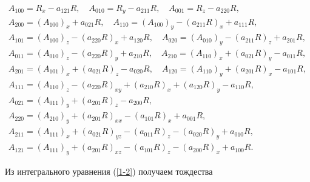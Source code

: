 \begin{gather*}


A_{100}=R_{x}-a_{121}R,\quad A_{010}=R_{y}-a_{211}R,\quad


A_{001}=R_{z}-a_{220}R,\\


A_{200}=(A_{100})_{x}+a_{021}R,\quad


A_{110}=(A_{100})_{y}-(a_{211}R)_{x}+a_{111}R,\\


A_{101}=(A_{100})_{z}-(a_{220}R)_{x}+a_{120}R,\quad


A_{020}=(A_{010})_{y}-(a_{211}R)_{z}+a_{201}R,\\


A_{011}=(A_{010})_{z}-(a_{220}R)_{y}+a_{210}R,\quad


A_{210}=(A_{110})_{x}+(a_{021}R)_{y}-a_{011}R,\\


A_{201}=(A_{101})_{x}+(a_{021}R)_{z}-a_{020}R,\quad


A_{120}=(A_{110})_{y}+(a_{201}R)_{x}-a_{101}R,\\


A_{111}=(A_{110})_{z}-(a_{220}R)_{xy}+(a_{210}R)_{x}


+(a_{120}R)_{y}-a_{110}R,\\


A_{021}=(A_{011})_{y}+(a_{201}R)_{z}-a_{200}R,\\


A_{220}=(A_{210})_{y}+(a_{201}R)_{xx}-(a_{101}R)_{x}+a_{001}R,\\


A_{211}=(A_{111})_{x}+(a_{021}R)_{yz}-(a_{011}R)_{z}


-(a_{020}R)_{y}+a_{010}R,\\


A_{121}=(A_{111})_{y}+(a_{201}R)_{xz}-(a_{101}R)_{z}


-(a_{200}R)_{x}+a_{100}R.


\end{gather*}


Из интегрального уравнения (\ref{1-2}) получаем тождества


